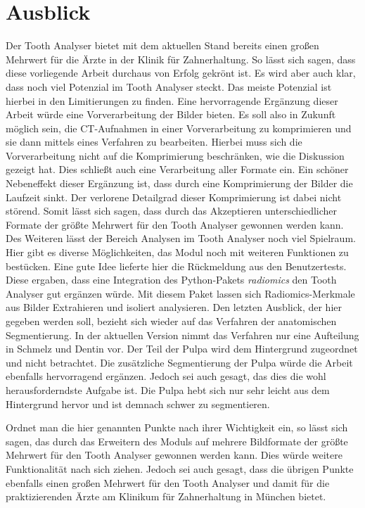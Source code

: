 \chapter{Ausblick}
\label{chap:schlussfolgerung} Der Tooth Analyser bietet mit dem aktuellen Stand bereits
einen großen Mehrwert für die Ärzte in der Klinik für Zahnerhaltung. So lässt
sich sagen, dass diese vorliegende Arbeit durchaus von Erfolg gekrönt ist. Es
wird aber auch klar, dass noch viel Potenzial im Tooth Analyser steckt. Das
meiste Potenzial ist hierbei in den Limitierungen zu finden. Eine hervorragende Ergänzung
dieser Arbeit würde eine Vorverarbeitung der Bilder bieten. Es soll also in
Zukunft möglich sein, die \ac{CT}-Aufnahmen in einer Vorverarbeitung zu
komprimieren und sie dann mittels eines Verfahren zu bearbeiten. Hierbei muss sich
die Vorverarbeitung nicht auf die Komprimierung beschränken, wie die Diskussion
gezeigt hat. Dies schließt auch eine Verarbeitung aller Formate ein. Ein schöner
Nebeneffekt dieser Ergänzung ist, dass durch eine Komprimierung der Bilder die Laufzeit
sinkt. Der verlorene Detailgrad dieser Komprimierung ist dabei nicht störend. Somit
lässt sich sagen, dass durch das Akzeptieren unterschiedlicher Formate der
größte Mehrwert für den Tooth Analyser gewonnen werden kann. Des Weiteren lässt der
Bereich Analysen im Tooth Analyser noch viel Spielraum. Hier gibt es diverse
Möglichkeiten, das Modul noch mit weiteren Funktionen zu bestücken. Eine gute
Idee lieferte hier die Rückmeldung aus den Benutzertests. Diese ergaben, dass
eine Integration des Python-Pakets \textit{radiomics} den Tooth Analyser gut ergänzen
würde. Mit diesem Paket lassen sich Radiomics-Merkmale aus Bilder Extrahieren
und isoliert analysieren. Den letzten Ausblick, der hier gegeben werden soll, bezieht
sich wieder auf das Verfahren der anatomischen Segmentierung. In der aktuellen
Version nimmt das Verfahren nur eine Aufteilung in Schmelz und Dentin vor. Der Teil
der Pulpa wird dem Hintergrund zugeordnet und nicht betrachtet. Die zusätzliche
Segmentierung der Pulpa würde die Arbeit ebenfalls hervorragend ergänzen. Jedoch
sei auch gesagt, das dies die wohl herausforderndste Aufgabe ist. Die Pulpa hebt
sich nur sehr leicht aus dem Hintergrund hervor und ist demnach schwer zu segmentieren.

Ordnet man die hier genannten Punkte nach ihrer Wichtigkeit ein, so lässt sich
sagen, das durch das Erweitern des Moduls auf mehrere Bildformate der größte Mehrwert
für den Tooth Analyser gewonnen werden kann. Dies würde weitere Funktionalität
nach sich ziehen. Jedoch sei auch gesagt, dass die übrigen Punkte ebenfalls
einen großen Mehrwert für den Tooth Analyser und damit für die praktizierenden
Ärzte am Klinikum für Zahnerhaltung in München bietet.
